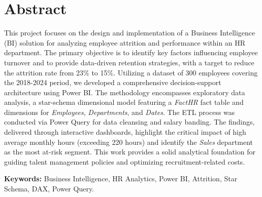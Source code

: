 \chapter*{Abstract}

\begin{onehalfspace}
This project focuses on the design and implementation of a Business Intelligence (BI) solution for analyzing employee attrition and performance within an HR department. The primary objective is to identify key factors influencing employee turnover and to provide data-driven retention strategies, with a target to reduce the attrition rate from 23\% to 15\%. Utilizing a dataset of 300 employees covering the 2018-2024 period, we developed a comprehensive decision-support architecture using Power BI. The methodology encompasses exploratory data analysis, a star-schema dimensional model featuring a \textit{FactHR} fact table and dimensions for \textit{Employees}, \textit{Departments}, and \textit{Dates}. The ETL process was conducted via Power Query for data cleansing and salary banding. The findings, delivered through interactive dashboards, highlight the critical impact of high average monthly hours (exceeding 220 hours) and identify the \textit{Sales} department as the most at-risk segment. This work provides a solid analytical foundation for guiding talent management policies and optimizing recruitment-related costs.

\textbf{Keywords:} Business Intelligence, HR Analytics, Power BI, Attrition, Star Schema, DAX, Power Query.
\end{onehalfspace}
